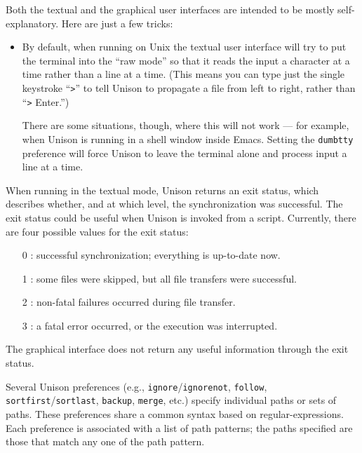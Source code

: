 \documentclass{article}
\begin{document}

Both the textual and the graphical user interfaces are intended to be
mostly self-explanatory.  Here are just a few tricks:
\begin{itemize}
\item By default, when running on Unix the textual user interface will
try to put the terminal into the ``raw mode'' so that it reads the input a
character at a time rather than a line at a time.  (This means you can
type just the single keystroke ``\verb|>|'' to tell Unison to
propagate a file from left to right, rather than ``\verb|>| Enter.'')

There are some situations, though, where this will not work --- for
example, when Unison is running in a shell window inside Emacs.
Setting the \verb|dumbtty| preference will force Unison to leave the
terminal alone and process input a line at a time.
\end{itemize}


When running in the textual mode, Unison returns an exit status, which
describes whether, and at which level, the synchronization was successful.
The exit status could be useful when Unison is invoked from a script.
Currently, there are four possible values for the exit status:
\begin{itemize}
\item [0]: successful synchronization; everything is up-to-date now.
\item [1]: some files were skipped, but all file transfers were successful.
\item [2]: non-fatal failures occurred during file transfer.
\item [3]: a fatal error occurred, or the execution was interrupted.
\end{itemize}
The graphical interface does not return any useful information through the
exit status.

Several Unison preferences (e.g., \verb|ignore|/\verb|ignorenot|,
\verb|follow|, \verb|sortfirst|/\verb|sortlast|, \verb|backup|,
\verb|merge|, etc.)
specify individual paths or sets of paths.  These preferences share a
common syntax based on regular-expressions.  Each preference
is associated with a list of path patterns; the paths specified are those
that match any one of the path pattern.
\end{document}

